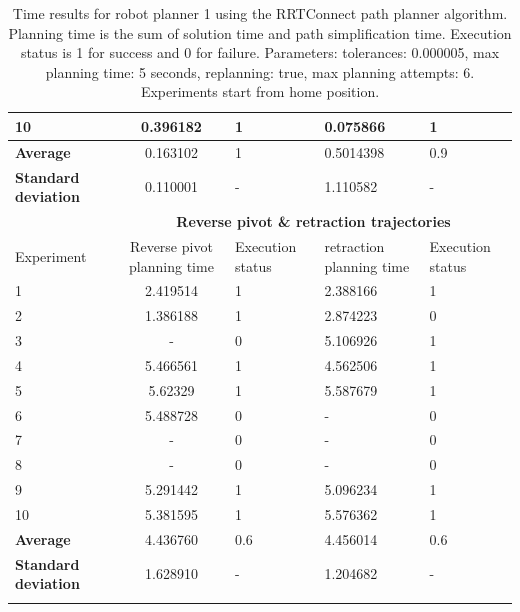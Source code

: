 \begin{longtable}{|p{2cm}|c|p{2cm}|p{2cm}|p{2cm}|}
10	& 0.396182	& 1	& 0.075866	& 1 \\
\hline
\textbf{Average} & 	0.163102 & 1	& 0.5014398 &	0.9 \\
\hline
\textbf{Standard deviation} & 	0.110001 &	- &	1.110582 & - \\
\hline
                          & \multicolumn{4}{c}{\textbf{Reverse pivot \& retraction trajectories}}                     \vline \\
\hline
Experiment                & Reverse pivot planning time & Execution status & retraction planning time & Execution status  \\
\hline
1 & 2.419514	& 1	& 2.388166	& 1 \\
2 & 1.386188	& 1	& 2.874223	& 0 \\
3 & -	& 0	& 5.106926	& 1 \\
4 & 5.466561	& 1	& 4.562506	& 1 \\
5 & 5.62329	& 1	& 5.587679	& 1 \\
6 & 5.488728	& 0	& -	& 0 \\
7 & -	& 0	& -	& 0 \\
8 & -	& 0	& -	& 0 \\
9 & 5.291442	& 1	& 5.096234	& 1 \\
10 & 5.381595	& 1	& 5.576362	& 1 \\
\hline
\textbf{Average} & 	4.436760	& 0.6	& 4.456014	& 0.6 \\
\hline
\textbf{Standard deviation} & 	1.628910 &	- &	1.204682 & - \\
\hline
\caption{Time results for robot planner 1 using the RRTConnect path planner algorithm. Planning time is the sum of solution time and path simplification time. Execution status is 
1 for success and 0 for failure. Parameters: tolerances: 0.000005, max planning time: 5 seconds, replanning: true, max planning attempts: 6. Experiments start from home position.}
\label{robot-planner1-rrtconnect-data}
\end{longtable}


